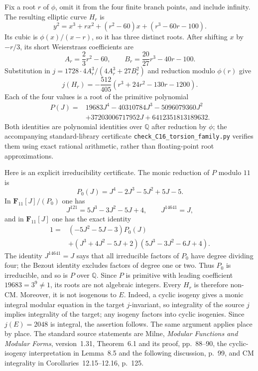 \documentclass[11pt]{article}
\newcommand{\Q}{\mathbb Q}\newcommand{\C}{\mathbb C}\newcommand{\Z}{\mathbb Z}\newcommand{\R}{\mathbb R}\newcommand{\A}{\mathbb A}\newcommand{\OO}{\mathcal O}
\theoremstyle{definition}\newtheorem{definition}[theorem]{Definition}\newtheorem{remark}[theorem]{Remark}
\begin{document}
Fix a root $r$ of $\phi$, omit it from the four finite branch points, and
include infinity.  The resulting elliptic curve $H_r$ is
\[
 y^2=x^3+rx^2+(r^2-60)x+(r^3-60r-100).
\]
Its cubic is $\phi(x)/(x-r)$, so it has three distinct roots.  After
shifting $x$ by $-r/3$, its short Weierstrass coefficients are
\[
 A_r=\frac23r^2-60,\qquad
 B_r=\frac{20}{27}r^3-40r-100.
\]
Substitution in $j=1728\cdot4A_r^3/(4A_r^3+27B_r^2)$ and reduction
modulo $\phi(r)$ give
\[
 j(H_r)=-\frac{512}{405}
       (r^3+24r^2-130r-1200).
\]
Each of the four values is a root of the primitive polynomial
\begin{align*}
 P(J)={}&19683J^4-40310784J^3-5096079360J^2\\
        &+37203006717952J+6412351813189632.
\end{align*}
Both identities are polynomial identities over $\Q$ after reduction by
$\phi$; the accompanying standard-library certificate
\nolinkurl{check_C16_torsion_family.py} verifies them using exact rational
arithmetic, rather than floating-point root approximations.

Here is an explicit irreducibility certificate.  The monic reduction of
$P$ modulo $11$ is
\[
 P_0(J)=J^4-2J^3-5J^2+5J-5.
\]
In $\mathbf F_{11}[J]/(P_0)$ one has
\[
 J^{121}=5J^3-3J^2-5J+4,
 \qquad J^{14641}=J,
\]
and in $\mathbf F_{11}[J]$ one has the exact identity
\begin{align*}
 1={}&(-5J^2-5J-3)P_0(J)\\
 &+(J^3+4J^2-5J+2)(5J^3-3J^2-6J+4).
\end{align*}
The identity $J^{14641}=J$ says that all irreducible factors of $P_0$
have degree dividing four; the Bezout identity excludes factors of degree
one or two.  Thus $P_0$ is irreducible, and so is $P$ over $\Q$.
Since $P$ is primitive with leading coefficient $19683=3^9\neq1$,
its roots are not algebraic integers.  Every $H_r$ is therefore non-CM.
Moreover, it is not isogenous to $E$.  Indeed, a cyclic isogeny gives a
monic integral modular equation in the target $j$-invariant, so integrality
of the source $j$ implies integrality of the target; any isogeny factors
into cyclic isogenies.  Since $j(E)=2048$ is integral, the assertion follows.
The same argument applies place by place.  The standard source statements
are Milne, \emph{Modular Functions and Modular Forms}, version~1.31,
Theorem~6.1 and its proof, pp.~88--90, the cyclic-isogeny interpretation
in Lemma~8.5 and the following discussion, p.~99, and CM integrality in
Corollaries~12.15--12.16, p.~125.
\end{document}
